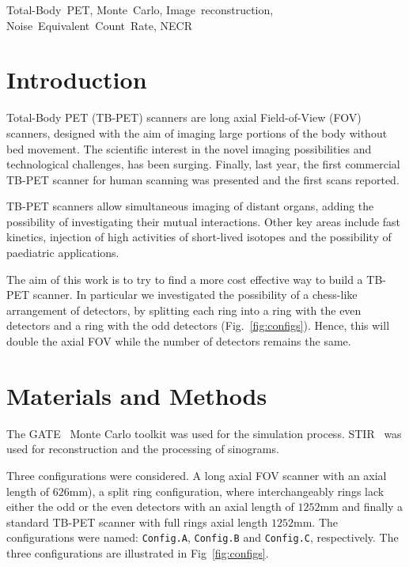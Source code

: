 \documentclass[journal]{IEEEtran}
\begin{document}
\begin{IEEEkeywords}
    Total-Body~PET, Monte~Carlo, Image~reconstruction, Noise~Equivalent~Count~Rate, NECR
\end{IEEEkeywords}

\section{Introduction}
Total-Body PET (TB-PET) scanners are long axial Field-of-View (FOV) scanners, designed with the aim of imaging large portions of the body without bed movement\cite{Moskal2016PotentialSystem, Cherry2018Total-BodyCare.}. The scientific interest in the novel imaging possibilities and technological challenges, has been surging. Finally, last year, the first commercial TB-PET scanner for human scanning was presented and the first scans reported\cite{Leung2018PerformanceScanner, Badawi2019FirstScanner.}.

TB-PET scanners allow simultaneous imaging of distant organs, adding the possibility of investigating their mutual interactions. Other key areas include fast kinetics, injection of high activities of short-lived isotopes and the possibility of paediatric applications.

The aim of this work is to try to find a more cost effective way to build a TB-PET scanner.
In particular we investigated the possibility of a chess-like arrangement of detectors, by splitting each ring into a ring with the even detectors and a ring with the odd detectors (Fig.~\ref{fig:configs}). Hence, this will double the axial FOV while the number of detectors remains the same. 

\section{Materials and Methods}
The GATE~\cite{Jan2004} Monte Carlo toolkit was used for the simulation process. STIR~\cite{Thielemans2012P} was used for reconstruction and the processing of sinograms.

Three configurations were considered. A long axial FOV scanner with an axial length of $626$mm), a split ring configuration, where interchangeably rings lack either the odd or the even detectors with an axial length of $1252$mm and finally a standard TB-PET scanner with full rings axial length $1252$mm. The configurations were named: \texttt{Config.A}, \texttt{Config.B} and \texttt{Config.C}, respectively. The three configurations are illustrated in Fig~\ref{fig:configs}. 
\end{document}
